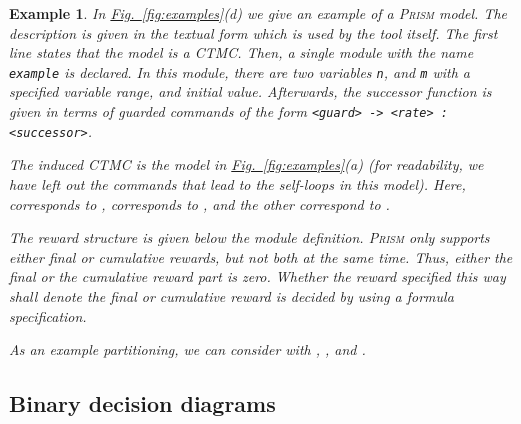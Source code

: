\documentclass[10pt,twocolumn]{article}
\newtheorem{example}{Example}
\newcommand{\PRISM}{\textsc{Prism}\xspace}
\newcommand{\reffig}[1]{\texorpdfstring{\hyperref[fig:#1]{Fig.~\ref*{fig:#1}}}{Fig.~\ref*{fig:#1}}}
\begin{document}
\begin{example}
  \label{exa:prism}
In \reffig{examples}(d) we give an example of a \PRISM model.
  The description is given in the textual form which is used by the tool itself.
  The first line states that the model is a CTMC.
  Then, a single module with the name \texttt{example} is declared.
  In this module, there are two variables \texttt{n}, and \texttt{m} with a specified variable range, and initial value.
  Afterwards, the successor function is given in terms of guarded commands of the form \texttt{<guard> -> <rate> : <successor>}.

  The induced CTMC is the model in \reffig{examples}(a) (for readability, we have left out the commands that lead to the self-loops in this model).
  Here,  corresponds to ,  corresponds to 
  , and the other  correspond to .

  The reward structure is given below the module definition.
  \PRISM only supports either final or cumulative rewards, but not both at the same time.
  Thus, either the final or the cumulative reward part is zero.
  Whether the reward specified this way shall denote the final 
  or cumulative reward is decided by using a formula specification.

  As an example partitioning, we can consider  with
  , , and .
\end{example}

\subsection{Binary decision diagrams}
\label{subsec:obdds}
\end{document}
